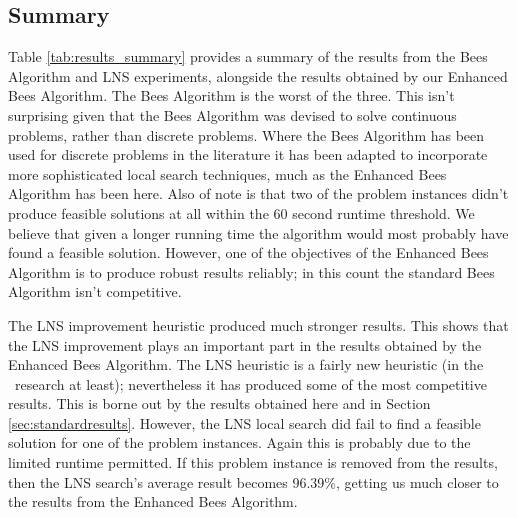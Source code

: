 \subsection{Summary}

Table \ref{tab:results_summary} provides a summary of the results from the Bees Algorithm and LNS experiments, alongside the results obtained by our Enhanced Bees Algorithm. The Bees Algorithm is the worst of the three. This isn't surprising given that the Bees Algorithm was devised to solve continuous problems, rather than discrete problems. Where the Bees Algorithm has been used for discrete problems in the literature it has been adapted to incorporate more sophisticated local search techniques, much as the Enhanced Bees Algorithm has been here. Also of note is that two of the problem instances didn't produce feasible solutions at all within the 60 second runtime threshold. We believe that given a longer running time the algorithm would most probably have found a feasible solution. However, one of the objectives of the Enhanced Bees Algorithm is to produce robust results reliably; in this count the standard Bees Algorithm isn't competitive. 

The LNS improvement heuristic produced much stronger results. This shows that the LNS improvement plays an important part in the results obtained by the Enhanced Bees Algorithm. The LNS heuristic is a fairly new heuristic (in the \VRP\ research at least); nevertheless it has produced some of the most competitive results. This is borne out by the results obtained here and in Section \ref{sec:standardresults}. However, the LNS local search did fail to find a feasible solution for one of the problem instances. Again this is probably due to the limited runtime permitted. If this problem instance is removed from the results, then the LNS search's average result becomes 96.39\%, getting us much closer to the results from the Enhanced Bees Algorithm.

